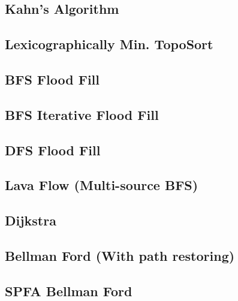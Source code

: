 \documentclass[10pt]{article}
\begin{document}
\begin{multicols*}{2}
\subsection{Kahn's Algorithm}


\subsection{Lexicographically Min. TopoSort}


\subsection{BFS Flood Fill}


\subsection{BFS Iterative Flood Fill}


\subsection{DFS Flood Fill}


\subsection{Lava Flow (Multi-source BFS)}


\subsection{Dijkstra}


\subsection{Bellman Ford (With path restoring)}


\subsection{SPFA Bellman Ford}



\end{multicols*}
\end{document}
